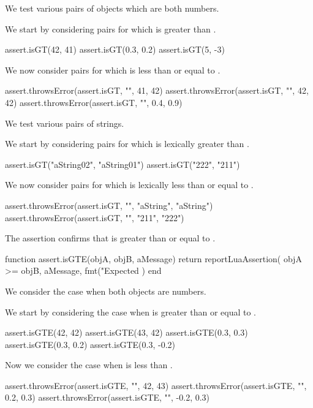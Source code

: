 We test various pairs of objects which are both numbers.

We start by considering pairs for which  is greater than 
. 

\startLuaTest
  assert.isGT(42, 41)
  assert.isGT(0.3, 0.2)
  assert.isGT(5, -3)
\stopLuaTest

We now consider pairs for which  is less than or equal to 
. 

\startLuaTest
  assert.throwsError(assert.isGT, "", 41, 42)
  assert.throwsError(assert.isGT, "", 42, 42)
  assert.throwsError(assert.isGT, "", 0.4, 0.9)
\stopLuaTest
\stopTestCase


We test various pairs of strings.

We start by considering pairs for which  is lexically greater 
than . 

\startLuaTest
  assert.isGT("aString02", "aString01")
  assert.isGT("222", "211")
\stopLuaTest

We now consider pairs for which  is lexically less than or 
equal to . 

\startLuaTest
  assert.throwsError(assert.isGT, "", "aString", "aString")
  assert.throwsError(assert.isGT, "", "211", "222")
\stopLuaTest
\stopTestCase

\stopTestSuite


The  assertion confirms that  is greater 
than or equal to . 

\startLuaCode
function assert.isGTE(objA, objB, aMessage)
  return reportLuaAssertion(
    objA >= objB,
    aMessage,
    fmt("Expected %
  )
end
\stopLuaCode


We consider the case when both objects are numbers.

We start by considering the case when  is greater than or equal 
to . 

\startLuaTest
  assert.isGTE(42, 42)
  assert.isGTE(43, 42)
  assert.isGTE(0.3, 0.3)
  assert.isGTE(0.3, 0.2)
  assert.isGTE(0.3, -0.2)
\stopLuaTest

Now we consider the case when  is less than . 

\startLuaTest
  assert.throwsError(assert.isGTE, "", 42, 43)
  assert.throwsError(assert.isGTE, "", 0.2, 0.3)
  assert.throwsError(assert.isGTE, "", -0.2, 0.3)
\stopLuaTest
\stopTestCase

